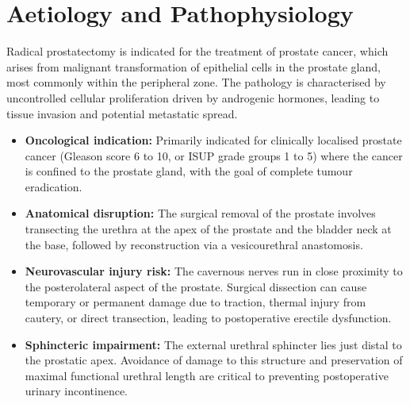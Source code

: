 \section*{Aetiology and Pathophysiology}
Radical prostatectomy is indicated for the treatment of prostate cancer, which arises from malignant transformation of epithelial cells in the prostate gland, most commonly within the peripheral zone. The pathology is characterised by uncontrolled cellular proliferation driven by androgenic hormones, leading to tissue invasion and potential metastatic spread.
\begin{itemize}
    \item \textbf{Oncological indication:} Primarily indicated for clinically localised prostate cancer (Gleason score 6 to 10, or ISUP grade groups 1 to 5) where the cancer is confined to the prostate gland, with the goal of complete tumour eradication.
    \item \textbf{Anatomical disruption:} The surgical removal of the prostate involves transecting the urethra at the apex of the prostate and the bladder neck at the base, followed by reconstruction via a vesicourethral anastomosis.
    \item \textbf{Neurovascular injury risk:} The cavernous nerves run in close proximity to the posterolateral aspect of the prostate. Surgical dissection can cause temporary or permanent damage due to traction, thermal injury from cautery, or direct transection, leading to postoperative erectile dysfunction.
    \item \textbf{Sphincteric impairment:} The external urethral sphincter lies just distal to the prostatic apex. Avoidance of damage to this structure and preservation of maximal functional urethral length are critical to preventing postoperative urinary incontinence.
\end{itemize}

